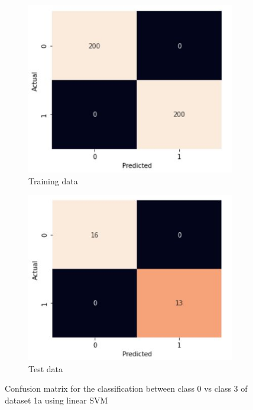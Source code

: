 \documentclass[11pt]{article}
\begin{document}
\begin{figure}[h]
\centering
	\begin{subfigure}[b]{0.45\textwidth}
	\centering
	\includegraphics[scale=0.35]{dataset1a_linear_svm_03_cm_train.jpg}
	\caption{Training data}
	\label{fig:fig1.3.3.1}
	\end{subfigure}
	\begin{subfigure}[b]{0.45\textwidth}
	\centering
	\includegraphics[scale=0.35]{dataset1a_linear_svm_03_cm_test.jpg}
	\caption{Test data}
	\label{fig:fig1.3.3.2}
	\end{subfigure}
\caption{Confusion matrix for the classification between class 0 vs class 3 of dataset 1a using linear SVM}
\label{fig:fig1.3.3}
\end{figure}
\end{document}

